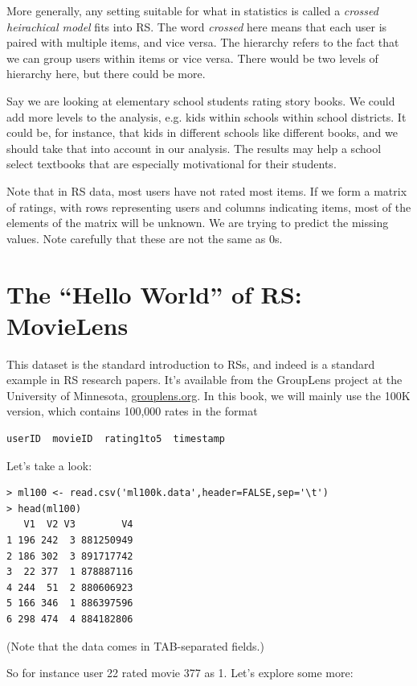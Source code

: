 More generally, any setting suitable for what in statistics is called
a \textit{crossed heirachical model} fits into RS.  The word
\textit{crossed} here means that each user is paired with multiple
items, and vice versa.  The hierarchy refers to the fact that we can
group users within items or vice versa.  There would be two levels of
hierarchy here, but there could be more.  

Say we are looking at elementary school students rating story books.  We
could add more levels to the analysis, e.g. kids within schools within
school districts.  It could be, for instance, that kids in different
schools like different books, and we should take that into account in
our analysis.  The results may help a school select textbooks that are
especially motivational for their students.

Note that in RS data, most users have not rated most items.  If we form
a matrix of ratings, with rows representing users and columns indicating
items, most of the elements of the matrix will be unknown.  We are
trying to predict the missing values.  Note carefully that these are not
the same as 0s.

\section{The ``Hello World'' of RS:  MovieLens}

This dataset is the standard introduction to RSs, and indeed is a
standard example in RS research papers.  It's available from the
GroupLens project at the University of Minnesota, \url{grouplens.org}.
In this book, we will mainly use the 100K version, which contains
100,000 rates in the format

\begin{lstlisting}
userID  movieID  rating1to5  timestamp
\end{lstlisting}

Let's take a look:

\begin{lstlisting}
> ml100 <- read.csv('ml100k.data',header=FALSE,sep='\t')
> head(ml100)
   V1  V2 V3        V4
1 196 242  3 881250949
2 186 302  3 891717742
3  22 377  1 878887116
4 244  51  2 880606923
5 166 346  1 886397596
6 298 474  4 884182806
\end{lstlisting}

(Note that the data comes in TAB-separated fields.)

So for instance user 22 rated movie 377 as 1.  Let's explore some more:

